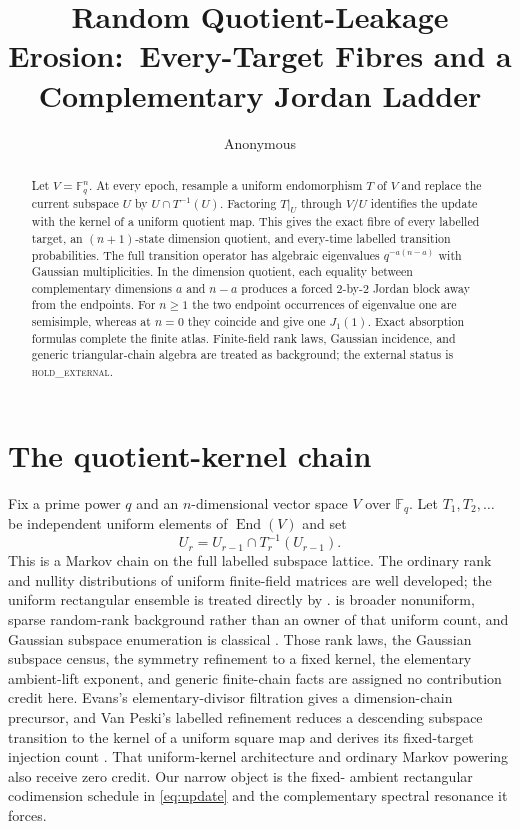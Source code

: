 \documentclass[a4paper,10pt]{amsart}
\title[Random quotient-leakage erosion]{Random Quotient-Leakage Erosion:\
Every-Target Fibres and a Complementary Jordan Ladder}
\author{Anonymous}
\date{}
\theoremstyle{remark}
\newcommand{\F}{\mathbb F}
\newcommand{\End}{\operatorname{End}}
\begin{document}
\begin{abstract}
Let $V=\F_q^n$.  At every epoch, resample a uniform endomorphism $T$ of
$V$ and replace the current subspace $U$ by $U\cap T^{-1}(U)$.  Factoring
$T|_U$ through $V/U$ identifies the update with the kernel of a uniform
quotient map.  This gives the exact fibre of every labelled target, an
$(n+1)$-state dimension quotient, and every-time labelled transition
probabilities.  The full transition operator has algebraic eigenvalues
$q^{-a(n-a)}$ with Gaussian multiplicities.  In the dimension quotient,
each equality between complementary dimensions $a$ and $n-a$ produces a
forced $2$-by-$2$ Jordan block away from the endpoints.  For $n\ge1$ the
two endpoint occurrences of eigenvalue one are semisimple, whereas at
$n=0$ they coincide and give one $J_1(1)$.  Exact absorption formulas
complete the finite atlas.  Finite-field rank laws, Gaussian
incidence, and generic triangular-chain algebra are treated as background;
the external status is \textsc{hold\_external}.
\end{abstract}

\maketitle

\section{The quotient-kernel chain}

Fix a prime power $q$ and an $n$-dimensional vector space $V$ over $\F_q$.
Let $T_1,T_2,\ldots$ be independent uniform elements of $\End(V)$ and set
\begin{equation}\label{eq:update}
                 U_r=U_{r-1}\cap T_r^{-1}(U_{r-1}).
\end{equation}
This is a Markov chain on the full labelled subspace lattice.  The ordinary
rank and nullity distributions of uniform finite-field matrices are well
developed; the uniform rectangular ensemble is treated directly by
\citet{FulmanGoldstein2015}.  \citet{Balakin1968} is broader nonuniform,
sparse random-rank background rather than an owner of that uniform count,
and Gaussian subspace enumeration is classical \cite{GoldmanRota1970}.
Those rank laws, the Gaussian subspace census, the symmetry refinement to a
fixed kernel, the elementary ambient-lift exponent, and generic finite-chain
facts are assigned no contribution credit here.  Evans's elementary-divisor
filtration gives a dimension-chain precursor, and Van Peski's labelled
refinement reduces a descending subspace transition to the kernel of a
uniform square map and derives its fixed-target injection count
\cite{Evans2002,VanPeski2018}.  That uniform-kernel architecture and ordinary
Markov powering also receive zero credit.  Our narrow object is the fixed-
ambient rectangular codimension schedule in \eqref{eq:update} and the
complementary spectral resonance it forces.
\end{document}
